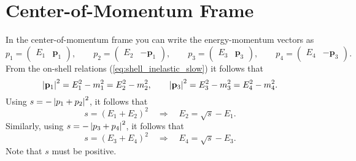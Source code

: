 \section{Center-of-Momentum Frame}
In the center-of-momentum frame you can write the energy-momentum vectors as
\begin{equation}
	p_{1} = \begin{pmatrix} E_{1} & \mathbf{p}_{1} \end{pmatrix}, \qquad p_{2} = \begin{pmatrix} E_{2} & -\mathbf{p}_{1} \end{pmatrix}, \qquad p_{3} = \begin{pmatrix} E_{3} & \mathbf{p}_{3} \end{pmatrix}, \qquad p_{4} = \begin{pmatrix} E_{4} & -\mathbf{p}_{3} \end{pmatrix}.
\end{equation}
From the on-shell relations (\ref{eq:shell_inelastic_slow}) it follows that
\begin{equation}
	\left\lvert \mathbf{p}_{1} \right\rvert^{2} = E_{1}^{2} - m_{1}^{2} = E_{2}^{2} - m_{2}^{2}, \qquad \left\lvert \mathbf{p}_{3} \right\rvert^{2} = E_{3}^{2} - m_{3}^{2} = E_{4}^{2} - m_{4}^{2}.
\end{equation}
Using $s = -\left\lvert p_{1} + p_{2} \right\rvert^{2}$, it follows that
\begin{equation}
	s = \left( E_{1} + E_{2} \right)^{2} \quad \Longrightarrow \quad E_{2} = \sqrt{s} - E_{1}.
\end{equation}
Similarly, using $s = -\left\lvert p_{3} + p_{4} \right\rvert^{2}$, it follows that
\begin{equation}
	s = \left( E_{3} + E_{4} \right)^{2} \quad \Longrightarrow \quad E_{4} = \sqrt{s} - E_{3}.
\end{equation}
Note that $s$ must be positive.

